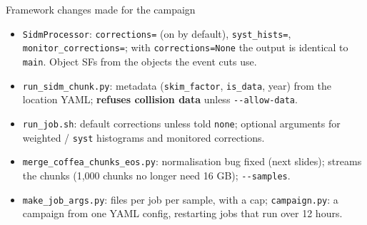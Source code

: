 \documentclass[aspectratio=169,11pt]{beamer}
\newcommand{\code}[1]{{\small\colorbox{codebg}{\texttt{#1}}}}
\begin{document}
\begin{frame}{Framework changes made for the campaign}
  \footnotesize
  \begin{itemize}
    \item \code{SidmProcessor}: \code{corrections=} (on by default), \code{syst\_hists=},
          \code{monitor\_corrections=}; with \code{corrections=None} the output is identical to
          \texttt{main}. Object SFs from the objects the event cuts use.
    \item \code{run\_sidm\_chunk.py}: metadata (\code{skim\_factor}, \code{is\_data}, year) from the
          location YAML; \textbf{refuses collision data} unless \code{-{}-allow-data}.
    \item \code{run\_job.sh}: default corrections unless told \code{none}; optional arguments for
          weighted / \code{syst} histograms and monitored corrections.
    \item \code{merge\_coffea\_chunks\_eos.py}: normalisation bug fixed (next slides); streams the
          chunks (1,000 chunks no longer need 16 GB); \code{-{}-samples}.
    \item \code{make\_job\_args.py}: files per job per sample, with a cap; \code{campaign.py}: a
          campaign from one YAML config, restarting jobs that run over 12 hours.
  \end{itemize}
\end{frame}
\end{document}
